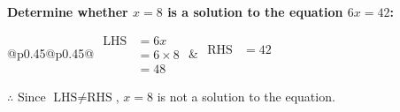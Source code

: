 \documentclass[12pt, varwidth, border={5mm 5mm 5mm 5mm}]{standalone}
\begin{document}
    \noindent \textbf{Determine whether \(x = 8\) is a solution to the equation \(6x = 42\):}
\vspace{2pt}  %

\noindent
\renewcommand{\arraystretch}{1.3} %
\begin{tabular}{@{}p{0.45\linewidth}@{}p{0.45\linewidth}@{}}
    \(\begin{aligned}
        \text{LHS} &= 6x \\
                   &= 6 \times8 \\
                   &= 48 
    \end{aligned}\) &
    \(\begin{aligned}
        \text{RHS} &= 42\\
                   & \\
                   &
    \end{aligned}\)
\end{tabular}
\renewcommand{\arraystretch}{1.0} %
\vspace{2pt}  %

\noindent \(\therefore\) Since \(\text{LHS} \neq \text{RHS}\), \(x = 8\) is not  a solution to the equation.
\end{document}
